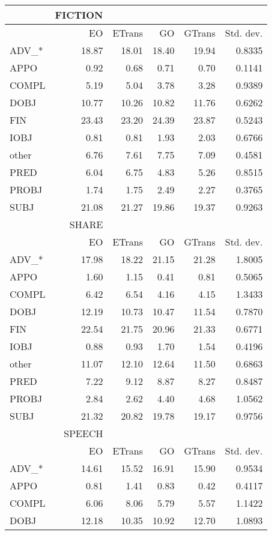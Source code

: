 \documentclass[output=paper]{LSP/langsci}
\begin{document}
\begin{table}
\small
\begin{tabular}{lrrrrr} 
\lsptoprule
& {FICTION}\\
\midrule
& EO & ETrans & GO & GTrans & Std. dev.\\
ADV\_* & 18.87 & 18.01 & 18.40 & 19.94 & 0.8335\\
APPO & 0.92 & 0.68 & 0.71 & 0.70 & 0.1141\\
COMPL & 5.19 & 5.04 & 3.78 & 3.28 & 0.9389\\
DOBJ & 10.77 & 10.26 & 10.82 & 11.76 & 0.6262\\
FIN & 23.43 & 23.20 & 24.39 & 23.87 & 0.5243\\
IOBJ & 0.81 & 0.81 & 1.93 & 2.03 & 0.6766\\
other & 6.76 & 7.61 & 7.75 & 7.09 & 0.4581\\
PRED & 6.04 & 6.75 & 4.83 & 5.26 & 0.8515\\
PROBJ & 1.74 & 1.75 & 2.49 & 2.27 & 0.3765\\
SUBJ & 21.08 & 21.27 & 19.86 & 19.37 & 0.9263\\
\midrule
& {SHARE}\\
\midrule
& EO & ETrans & GO & GTrans & Std. dev.\\
ADV\_* & 17.98 & 18.22 & 21.15 & 21.28 & 1.8005\\
APPO & 1.60 & 1.15 & 0.41 & 0.81 & 0.5065\\
COMPL & 6.42 & 6.54 & 4.16 & 4.15 & 1.3433\\
DOBJ & 12.19 & 10.73 & 10.47 & 11.54 & 0.7870\\
FIN & 22.54 & 21.75 & 20.96 & 21.33 & 0.6771\\
IOBJ & 0.88 & 0.93 & 1.70 & 1.54 & 0.4196\\
other & 11.07 & 12.10 & 12.64 & 11.50 & 0.6863\\
PRED & 7.22 & 9.12 & 8.87 & 8.27 & 0.8487\\
PROBJ & 2.84 & 2.62 & 4.40 & 4.68 & 1.0562\\
SUBJ & 21.32 & 20.82 & 19.78 & 19.17 & 0.9756\\
\midrule
& {SPEECH}\\
\midrule
& EO & ETrans & GO & GTrans & Std. dev.\\
ADV\_* & 14.61 & 15.52 & 16.91 & 15.90 & 0.9534\\
APPO & 0.81 & 1.41 & 0.83 & 0.42 & 0.4117\\
COMPL & 6.06 & 8.06 & 5.79 & 5.57 & 1.1422\\
DOBJ & 12.18 & 10.35 & 10.92 & 12.70 & 1.0893\\

\end{tabular}
\end{table}
\end{document}
